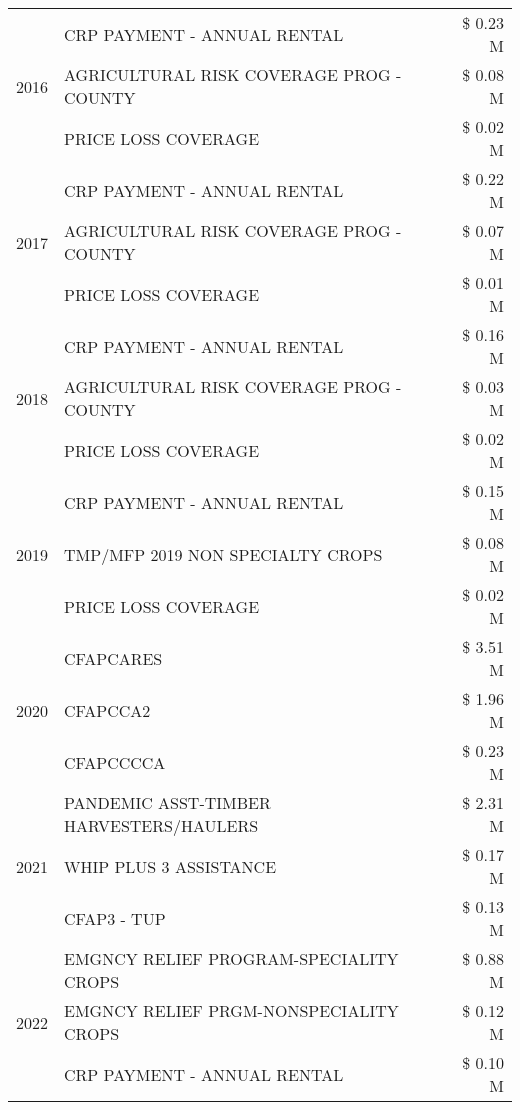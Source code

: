 \begin{tabular}{llr}
\cline{1-3}
\multirow[t]{3}{*}{2016} & CRP PAYMENT - ANNUAL RENTAL & \$ 0.23 M \\
 & AGRICULTURAL RISK COVERAGE PROG - COUNTY & \$ 0.08 M \\
 & PRICE LOSS COVERAGE & \$ 0.02 M \\
\cline{1-3}
\multirow[t]{3}{*}{2017} & CRP PAYMENT - ANNUAL RENTAL & \$ 0.22 M \\
 & AGRICULTURAL RISK COVERAGE PROG - COUNTY & \$ 0.07 M \\
 & PRICE LOSS COVERAGE & \$ 0.01 M \\
\cline{1-3}
\multirow[t]{3}{*}{2018} & CRP PAYMENT - ANNUAL RENTAL & \$ 0.16 M \\
 & AGRICULTURAL RISK COVERAGE PROG - COUNTY & \$ 0.03 M \\
 & PRICE LOSS COVERAGE & \$ 0.02 M \\
\cline{1-3}
\multirow[t]{3}{*}{2019} & CRP PAYMENT - ANNUAL RENTAL & \$ 0.15 M \\
 & TMP/MFP 2019 NON SPECIALTY CROPS & \$ 0.08 M \\
 & PRICE LOSS COVERAGE & \$ 0.02 M \\
\cline{1-3}
\multirow[t]{3}{*}{2020} & CFAPCARES & \$ 3.51 M \\
 & CFAPCCA2 & \$ 1.96 M \\
 & CFAPCCCCA & \$ 0.23 M \\
\cline{1-3}
\multirow[t]{3}{*}{2021} & PANDEMIC ASST-TIMBER HARVESTERS/HAULERS & \$ 2.31 M \\
 & WHIP PLUS 3 ASSISTANCE & \$ 0.17 M \\
 & CFAP3 - TUP & \$ 0.13 M \\
\cline{1-3}
\multirow[t]{3}{*}{2022} & EMGNCY RELIEF PROGRAM-SPECIALITY CROPS & \$ 0.88 M \\
 & EMGNCY RELIEF PRGM-NONSPECIALITY CROPS & \$ 0.12 M \\
 & CRP PAYMENT - ANNUAL RENTAL & \$ 0.10 M \\
\cline{1-3}
\bottomrule
\end{tabular}
